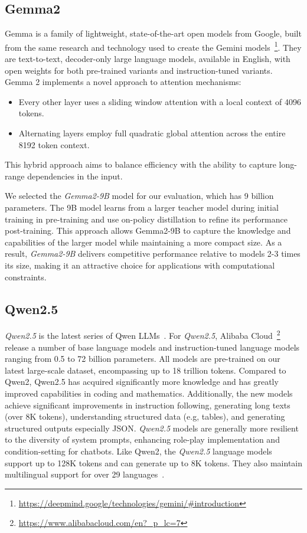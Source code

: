 \subsection{Gemma2}\label{subsec:empirical-evaluation:candidate-models:gemma2}
Gemma is a family of lightweight, state-of-the-art open models from Google, built from the same research and technology used to create the Gemini models~\footnote{\url{https://deepmind.google/technologies/gemini/#introduction}}.
They are text-to-text, decoder-only large language models, available in English, with open weights for both pre-trained variants and instruction-tuned variants.
Gemma 2 implements a novel approach to attention mechanisms:
\begin{itemize}
    \item Every other layer uses a sliding window attention with a local context of 4096 tokens.
    \item Alternating layers employ full quadratic global attention across the entire 8192 token context.
\end{itemize}
This hybrid approach aims to balance efficiency with the ability to capture long-range dependencies in the input.

We selected the \textit{Gemma2-9B} model for our evaluation, which has 9 billion parameters.
The 9B model learns from a larger teacher model during initial training in pre-training and use on-policy distillation to refine its performance post-training.
This approach allows Gemma2-9B to capture the knowledge and capabilities of the larger model while maintaining a more compact size.
As a result, \textit{Gemma2-9B} delivers competitive performance relative to models 2-3 times its size, making it an attractive choice for applications with computational constraints.

\subsection{Qwen2.5}\label{subsec:empirical-evaluation:candidate-models:qwen2.5}
\textit{Qwen2.5} is the latest series of Qwen LLMs~\cite{qwen2}.
For \textit{Qwen2.5}, Alibaba Cloud~\footnote{\url{https://www.alibabacloud.com/en?_p_lc=7}} release a number of base language models and instruction-tuned language models ranging from 0.5 to 72 billion parameters.
All models are pre-trained on our latest large-scale dataset, encompassing up to 18 trillion tokens.
Compared to Qwen2, Qwen2.5 has acquired significantly more knowledge and has greatly improved capabilities in coding and mathematics.
Additionally, the new models achieve significant improvements in instruction following, generating long texts (over 8K tokens), understanding structured data (e.g, tables), and generating structured outputs especially JSON.
\textit{Qwen2.5} models are generally more resilient to the diversity of system prompts, enhancing role-play implementation and condition-setting for chatbots.
Like Qwen2, the \textit{Qwen2.5} language models support up to 128K tokens and can generate up to 8K tokens.
They also maintain multilingual support for over 29 languages~\cite{qwen2.5}.

